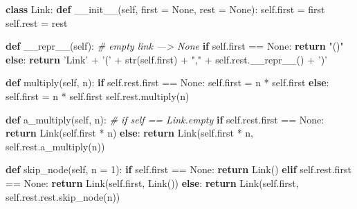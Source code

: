 \documentclass[11pt]{article}
\newenvironment{Shaded}{}{}
\newcommand{\KeywordTok}[1]{\textcolor[rgb]{0.00,0.44,0.13}{\textbf{{#1}}}}
\newcommand{\DecValTok}[1]{\textcolor[rgb]{0.25,0.63,0.44}{{#1}}}
\newcommand{\StringTok}[1]{\textcolor[rgb]{0.25,0.44,0.63}{{#1}}}
\newcommand{\CommentTok}[1]{\textcolor[rgb]{0.38,0.63,0.69}{\textit{{#1}}}}
\newcommand{\FunctionTok}[1]{\textcolor[rgb]{0.02,0.16,0.49}{{#1}}}
\newcommand{\NormalTok}[1]{{#1}}
\newcommand{\VariableTok}[1]{\textcolor[rgb]{0.10,0.09,0.49}{{#1}}}
\newcommand{\ControlFlowTok}[1]{\textcolor[rgb]{0.00,0.44,0.13}{\textbf{{#1}}}}
\newcommand{\OperatorTok}[1]{\textcolor[rgb]{0.40,0.40,0.40}{{#1}}}
\newcommand{\BuiltInTok}[1]{{#1}}
\begin{document}
\begin{Shaded}
\begin{Highlighting}[]
\KeywordTok{class}\NormalTok{ Link:}
    \KeywordTok{def} \FunctionTok{__init__}\NormalTok{(}\VariableTok{self}\NormalTok{, first }\OperatorTok{=} \VariableTok{None}\NormalTok{, rest }\OperatorTok{=} \VariableTok{None}\NormalTok{):}
        \VariableTok{self}\NormalTok{.first }\OperatorTok{=}\NormalTok{ first}
        \VariableTok{self}\NormalTok{.rest }\OperatorTok{=}\NormalTok{ rest}
        
    \KeywordTok{def} \FunctionTok{__repr__}\NormalTok{(}\VariableTok{self}\NormalTok{):}
        \CommentTok{# empty link ---> None }
        \ControlFlowTok{if} \VariableTok{self}\NormalTok{.first }\OperatorTok{==} \VariableTok{None}\NormalTok{:}
            \ControlFlowTok{return} \StringTok{"()"}
        \ControlFlowTok{else}\NormalTok{:}
            \ControlFlowTok{return} \StringTok{'Link'} \OperatorTok{+} \StringTok{'('} \OperatorTok{+} \BuiltInTok{str}\NormalTok{(}\VariableTok{self}\NormalTok{.first) }\OperatorTok{+} \StringTok{","} \OperatorTok{+} \VariableTok{self}\NormalTok{.rest.}\FunctionTok{__repr__}\NormalTok{() }\OperatorTok{+} \StringTok{')'}
            
    \KeywordTok{def}\NormalTok{ multiply(}\VariableTok{self}\NormalTok{, n):}
        \ControlFlowTok{if} \VariableTok{self}\NormalTok{.rest.first }\OperatorTok{==} \VariableTok{None}\NormalTok{:}
            \VariableTok{self}\NormalTok{.first }\OperatorTok{=}\NormalTok{ n }\OperatorTok{*} \VariableTok{self}\NormalTok{.first}
        \ControlFlowTok{else}\NormalTok{:}
            \VariableTok{self}\NormalTok{.first }\OperatorTok{=}\NormalTok{ n }\OperatorTok{*} \VariableTok{self}\NormalTok{.first}
            \VariableTok{self}\NormalTok{.rest.multiply(n)}
            
    \KeywordTok{def}\NormalTok{ a_multiply(}\VariableTok{self}\NormalTok{, n):}
        \CommentTok{# if self == Link.empty}
        \ControlFlowTok{if} \VariableTok{self}\NormalTok{.rest.first }\OperatorTok{==} \VariableTok{None}\NormalTok{:}
            \ControlFlowTok{return}\NormalTok{ Link(}\VariableTok{self}\NormalTok{.first }\OperatorTok{*}\NormalTok{ n)}
        \ControlFlowTok{else}\NormalTok{:}
            \ControlFlowTok{return}\NormalTok{ Link(}\VariableTok{self}\NormalTok{.first }\OperatorTok{*}\NormalTok{ n, }\VariableTok{self}\NormalTok{.rest.a_multiply(n))}
            
    \KeywordTok{def}\NormalTok{ skip_node(}\VariableTok{self}\NormalTok{, n }\OperatorTok{=} \DecValTok{1}\NormalTok{):}
        \ControlFlowTok{if} \VariableTok{self}\NormalTok{.first }\OperatorTok{==} \VariableTok{None}\NormalTok{:}
            \ControlFlowTok{return}\NormalTok{ Link()}
        \ControlFlowTok{elif} \VariableTok{self}\NormalTok{.rest.first }\OperatorTok{==} \VariableTok{None}\NormalTok{:}
            \ControlFlowTok{return}\NormalTok{ Link(}\VariableTok{self}\NormalTok{.first, Link())}
        \ControlFlowTok{else}\NormalTok{:}
            \ControlFlowTok{return}\NormalTok{ Link(}\VariableTok{self}\NormalTok{.first, }\VariableTok{self}\NormalTok{.rest.rest.skip_node(n))}
        

\end{Highlighting}
\end{Shaded}
\end{document}
